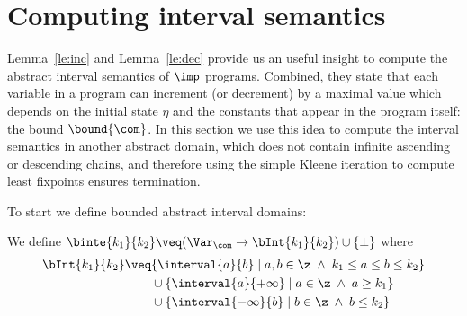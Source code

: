 \section{Computing interval semantics}\label{sec:computingint}

Lemma~\ref{le:inc} and Lemma~\ref{le:dec} provide us an useful insight
to compute the abstract interval semantics of \(\imp\)
programs. Combined, they state that each variable in a program can
increment (or decrement) by a maximal value which depends on the
initial state \(\eta\) and the constants that appear in the program
itself: the bound \(\bound{\com}\). In this section we use this idea
to compute the interval semantics in another abstract domain, which
does not contain infinite ascending or descending chains, and
therefore using the simple Kleene iteration to compute least
fixpoints ensures termination.

To start we define bounded abstract interval domains:


\begin{definition}\label{def:boundedint}
  We define
  \(\binte{k_1}{k_2} \veq (\Var_{\com} \to \bInt{k_1}{k_2}) \cup
  \{\bot\}\) where
  \begin{align*}
    \bInt{k_1}{k_2} & \veq \{ \interval{a}{b} \mid a, b \in \z \; \land \; k_1 \leq a \leq b \leq k_2\} \\
                    & \phantom{\veq} \cup \{\interval{a}{+\infty} \mid a \in \z \; \land \; a \geq k_1\} \\
                    & \phantom{\veq} \cup \{\interval{-\infty}{b} \mid b \in \z \; \land \; b \leq k_2\}
  \end{align*}
\end{definition}

